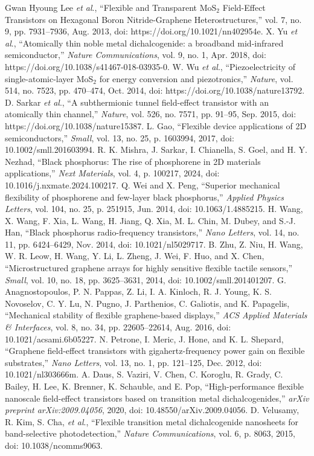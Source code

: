 \documentclass[conference]{IEEEtran}
\begin{document}
\begin{thebibliography}{00}
 Gwan Hyoung Lee \textit{et al}., ``Flexible and Transparent MoS$_2$ Field-Effect Transistors on Hexagonal Boron Nitride-Graphene Heterostructures,'' vol. 7, no. 9, pp. 7931–7936, Aug. 2013, doi: https://doi.org/10.1021/nn402954e.
 X. Yu \textit{et al}., ``Atomically thin noble metal dichalcogenide: a broadband mid-infrared semiconductor,'' \textit{Nature Communications}, vol. 9, no. 1, Apr. 2018, doi: https://doi.org/10.1038/s41467-018-03935-0.
 W. Wu \textit{et al}., ``Piezoelectricity of single-atomic-layer MoS$_2$ for energy conversion and piezotronics,'' \textit{Nature}, vol. 514, no. 7523, pp. 470–474, Oct. 2014, doi: https://doi.org/10.1038/nature13792.
 D. Sarkar \textit{et al}., ``A subthermionic tunnel field-effect transistor with an atomically thin channel,'' \textit{Nature}, vol. 526, no. 7571, pp. 91–95, Sep. 2015, doi: https://doi.org/10.1038/nature15387.
 L. Gao, ``Flexible device applications of 2D semiconductors,'' \textit{Small}, vol. 13, no. 25, p. 1603994, 2017, doi: 10.1002/smll.201603994.
 R. K. Mishra, J. Sarkar, I. Chianella, S. Goel, and H. Y. Nezhad, ``Black phosphorus: The rise of phosphorene in 2D materials applications,'' \textit{Next Materials}, vol. 4, p. 100217, 2024, doi: 10.1016/j.nxmate.2024.100217.
 Q. Wei and X. Peng, ``Superior mechanical flexibility of phosphorene and few-layer black phosphorus,'' \textit{Applied Physics Letters}, vol. 104, no. 25, p. 251915, Jun. 2014, doi: 10.1063/1.4885215.
 H. Wang, X. Wang, F. Xia, L. Wang, H. Jiang, Q. Xia, M. L. Chin, M. Dubey, and S.-J. Han, ``Black phosphorus radio-frequency transistors,'' \textit{Nano Letters}, vol. 14, no. 11, pp. 6424–6429, Nov. 2014, doi: 10.1021/nl5029717.
 B. Zhu, Z. Niu, H. Wang, W. R. Leow, H. Wang, Y. Li, L. Zheng, J. Wei, F. Huo, and X. Chen, ``Microstructured graphene arrays for highly sensitive flexible tactile sensors,'' \textit{Small}, vol. 10, no. 18, pp. 3625–3631, 2014, doi: 10.1002/smll.201401207.
 G. Anagnostopoulos, P. N. Pappas, Z. Li, I. A. Kinloch, R. J. Young, K. S. Novoselov, C. Y. Lu, N. Pugno, J. Parthenios, C. Galiotis, and K. Papagelis, ``Mechanical stability of flexible graphene-based displays,'' \textit{ACS Applied Materials \& Interfaces}, vol. 8, no. 34, pp. 22605–22614, Aug. 2016, doi: 10.1021/acsami.6b05227.
 N. Petrone, I. Meric, J. Hone, and K. L. Shepard, ``Graphene field-effect transistors with gigahertz-frequency power gain on flexible substrates,'' \textit{Nano Letters}, vol. 13, no. 1, pp. 121–125, Dec. 2012, doi: 10.1021/nl303666m.
 A. Daus, S. Vaziri, V. Chen, C. Koroglu, R. Grady, C. Bailey, H. Lee, K. Brenner, K. Schauble, and E. Pop, ``High-performance flexible nanoscale field-effect transistors based on transition metal dichalcogenides,'' \textit{arXiv preprint arXiv:2009.04056}, 2020, doi: 10.48550/arXiv.2009.04056.
 D. Velusamy, R. Kim, S. Cha, \textit{et al}., ``Flexible transition metal dichalcogenide nanosheets for band-selective photodetection,'' \textit{Nature Communications}, vol. 6, p. 8063, 2015, doi: 10.1038/ncomms9063.
\end{thebibliography}
\end{document}
